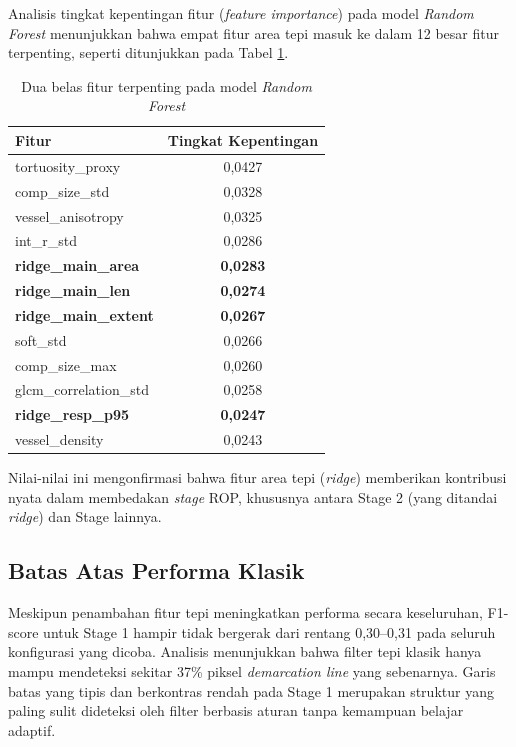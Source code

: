 Analisis tingkat kepentingan fitur (\textit{feature importance}) pada model \textit{Random
Forest} menunjukkan bahwa empat fitur area tepi masuk ke dalam 12 besar fitur terpenting,
seperti ditunjukkan pada Tabel \ref{tab:feature_importance}.

\begin{table}[H]
\centering
\caption{Dua belas fitur terpenting pada model \textit{Random Forest}}
\label{tab:feature_importance}
\begin{tabular}{l c}
\toprule
\textbf{Fitur} & \textbf{Tingkat Kepentingan} \\
\midrule
tortuosity\_proxy         & 0,0427 \\
comp\_size\_std           & 0,0328 \\
vessel\_anisotropy        & 0,0325 \\
int\_r\_std               & 0,0286 \\
\textbf{ridge\_main\_area}     & \textbf{0,0283} \\
\textbf{ridge\_main\_len}      & \textbf{0,0274} \\
\textbf{ridge\_main\_extent}   & \textbf{0,0267} \\
soft\_std                 & 0,0266 \\
comp\_size\_max           & 0,0260 \\
glcm\_correlation\_std    & 0,0258 \\
\textbf{ridge\_resp\_p95}      & \textbf{0,0247} \\
vessel\_density           & 0,0243 \\
\bottomrule
\end{tabular}
\end{table}

\noindent Nilai-nilai ini mengonfirmasi bahwa fitur area tepi (\textit{ridge}) memberikan
kontribusi nyata dalam membedakan \textit{stage} ROP, khususnya antara Stage 2 (yang ditandai
\textit{ridge}) dan Stage lainnya.

\subsection{Batas Atas Performa Klasik}

Meskipun penambahan fitur tepi meningkatkan performa secara keseluruhan, F1-score untuk Stage
1 hampir tidak bergerak dari rentang 0,30--0,31 pada seluruh konfigurasi yang dicoba. Analisis
menunjukkan bahwa filter tepi klasik hanya mampu mendeteksi sekitar 37\% piksel \textit{demarcation
line} yang sebenarnya. Garis batas yang tipis dan berkontras rendah pada Stage 1 merupakan
struktur yang paling sulit dideteksi oleh filter berbasis aturan tanpa kemampuan belajar
adaptif.

